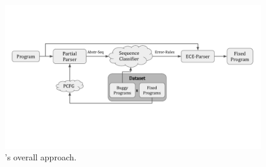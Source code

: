 






\begin{figure}[t]
  \centering
  \includegraphics[trim={0 4.1cm 0 3.85cm}, clip, width=\linewidth]{overall-approach.pdf}
  \caption{\toolname's overall approach.}
  \label{fig:overall-approach}
\end{figure}



